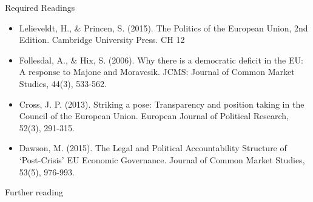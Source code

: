 \noindent Required Readings

\begin{itemize}
	\item Lelieveldt, H., \& Princen, S. (2015). The Politics of the European Union, 2nd Edition. Cambridge University Press. CH 12
	\item Follesdal, A., \& Hix, S. (2006). Why there is a democratic deficit in the EU: A response to Majone and Moravcsik. JCMS: Journal of Common Market Studies, 44(3), 533-562.
	\item Cross, J. P. (2013). Striking a pose: Transparency and position taking in the Council of the European Union. European Journal of Political Research, 52(3), 291-315.
	\item Dawson, M. (2015). The Legal and Political Accountability Structure of `Post-Crisis' EU Economic Governance. Journal of Common Market Studies, 53(5), 976-993.
\end{itemize}

\noindent Further reading

